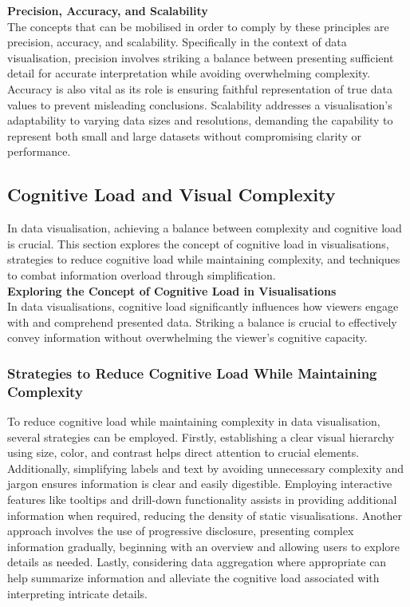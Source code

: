 \documentclass{article}\usepackage[]{graphicx}\usepackage[]{xcolor}
\begin{document}
\noindent 
\textbf{Precision, Accuracy, and Scalability}\\

\noindent
The concepts that can be mobilised in order to comply by these principles are precision, accuracy, and scalability. Specifically in the context of data visualisation, precision involves striking a balance between presenting sufficient detail for accurate interpretation while avoiding overwhelming complexity. Accuracy is also vital as its role is ensuring faithful representation of true data values to prevent misleading conclusions. Scalability addresses a visualisation's adaptability to varying data sizes and resolutions, demanding the capability to represent both small and large datasets without compromising clarity or performance.

\subsection{Cognitive Load and Visual Complexity}
In data visualisation, achieving a balance between complexity and cognitive load is crucial. This section explores the concept of cognitive load in visualisations, strategies to reduce cognitive load while maintaining complexity, and techniques to combat information overload through simplification.\\

\noindent 
\textbf{Exploring the Concept of Cognitive Load in Visualisations}\\

\noindent
In data visualisations, cognitive load significantly influences how viewers engage with and comprehend presented data. Striking a balance is crucial to effectively convey information without overwhelming the viewer's cognitive capacity.

\subsubsection{Strategies to Reduce Cognitive Load While Maintaining Complexity}

To reduce cognitive load while maintaining complexity in data visualisation, several strategies can be employed. Firstly, establishing a clear visual hierarchy using size, color, and contrast helps direct attention to crucial elements. Additionally, simplifying labels and text by avoiding unnecessary complexity and jargon ensures information is clear and easily digestible. Employing interactive features like tooltips and drill-down functionality assists in providing additional information when required, reducing the density of static visualisations. Another approach involves the use of progressive disclosure, presenting complex information gradually, beginning with an overview and allowing users to explore details as needed. Lastly, considering data aggregation where appropriate can help summarize information and alleviate the cognitive load associated with interpreting intricate details.\\
\end{document}
